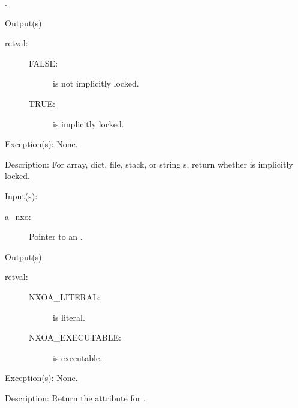 \begin{capi}
\begin{capilist}
\begin{description}
			.
		\end{description}
	\item[Output(s): ]
		\begin{description}\item[]
		\item[retval: ]
			\begin{description}\item[]
			\item[FALSE: ]
				 is not implicitly locked.
			\item[TRUE: ]
				 is implicitly locked.
			\end{description}
		\end{description}
	\item[Exception(s): ] None.
	\item[Description: ]
		For array, dict, file, stack, or string s,
		return whether  is implicitly locked.
	\end{capilist}
\label{nxo_attr_get}
	\begin{capilist}
	\item[Input(s): ]
		\begin{description}\item[]
		\item[a\_nxo: ]
			Pointer to an .
		\end{description}
	\item[Output(s): ]
		\begin{description}\item[]
		\item[retval: ]
			\begin{description}\item[]
			\item[NXOA\_LITERAL: ]
				 is literal.
			\item[NXOA\_EXECUTABLE: ]
				 is executable.
			\end{description}
		\end{description}
	\item[Exception(s): ] None.
	\item[Description: ]
		Return the attribute for .
	\end{capilist}
\label{nxo_attr_get}
	\begin{capilist}

\end{capilist}
\end{capi}
